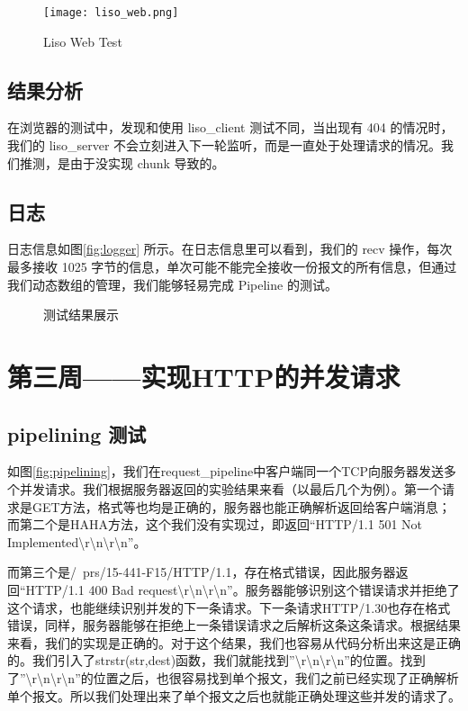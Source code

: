 \begin{figure}[htbp!]
    \centering
    \texttt{[image: liso\_web.png]}
    \caption{Liso Web Test}\label{fig:web}
\end{figure}

\subsection{结果分析}
在浏览器的测试中，发现和使用 liso\_client 测试不同，当出现有 404 的情况时，我们的 liso\_server 不会立刻进入下一轮监听，而是一直处于处理请求的情况。我们推测，是由于没实现 chunk 导致的。

\subsection{日志}
日志信息如图\ref{fig:logger} 所示。在日志信息里可以看到，我们的 recv 操作，每次最多接收 1025 字节的信息，单次可能不能完全接收一份报文的所有信息，但通过我们动态数组的管理，我们能够轻易完成 Pipeline 的测试。

\begin{figure}[htbp!]
    \centering
    \caption{测试结果展示}\label{fig:result}
\end{figure}


\section{第三周——实现HTTP的并发请求}


\subsection{pipelining 测试}

如图\ref{fig:pipelining}，我们在request\_pipeline中客户端同一个TCP向服务器发送多个并发请求。我们根据服务器返回的实验结果来看（以最后几个为例）。第一个请求是GET方法，格式等也均是正确的，服务器也能正确解析返回给客户端消息；而第二个是HAHA方法，这个我们没有实现过，即返回“HTTP/1.1 501 Not Implemented\textbackslash r\textbackslash n\textbackslash r\textbackslash n”。

而第三个是/~prs/15-441-F15/HTTP/1.1，存在格式错误，因此服务器返回“HTTP/1.1 400 Bad request\textbackslash r\textbackslash n\textbackslash r\textbackslash n”。服务器能够识别这个错误请求并拒绝了这个请求，也能继续识别并发的下一条请求。下一条请求HTTP/1.30也存在格式错误，同样，服务器能够在拒绝上一条错误请求之后解析这条这条请求。根据结果来看，我们的实现是正确的。对于这个结果，我们也容易从代码分析出来这是正确的。我们引入了strstr(str,dest)函数，我们就能找到”\textbackslash r\textbackslash n\textbackslash r\textbackslash n”的位置。找到了”\textbackslash r\textbackslash n\textbackslash r\textbackslash n”的位置之后，也很容易找到单个报文，我们之前已经实现了正确解析单个报文。所以我们处理出来了单个报文之后也就能正确处理这些并发的请求了。

